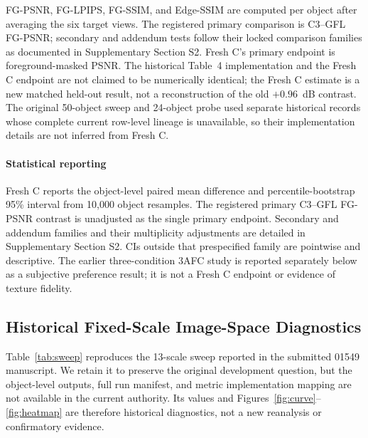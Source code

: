 \documentclass[times,twocolumn,final]{elsarticle}
\begin{document}
FG-PSNR, FG-LPIPS, FG-SSIM, and Edge-SSIM are computed per object after averaging the six target views. The registered primary comparison is C3--GFL FG-PSNR; secondary and addendum tests follow their locked comparison families as documented in Supplementary Section S2. Fresh C's primary endpoint is foreground-masked PSNR. The historical Table~4 implementation and the Fresh C endpoint are not claimed to be numerically identical; the Fresh C estimate is a new matched held-out result, not a reconstruction of the old $+0.96$~dB contrast. The original 50-object sweep and 24-object probe used separate historical records whose complete current row-level lineage is unavailable, so their implementation details are not inferred from Fresh C.

\paragraph{Statistical reporting}
Fresh C reports the object-level paired mean difference and percentile-bootstrap 95\% interval from 10{,}000 object resamples. The registered primary C3--GFL FG-PSNR contrast is unadjusted as the single primary endpoint. Secondary and addendum families and their multiplicity adjustments are detailed in Supplementary Section S2. CIs outside that prespecified family are pointwise and descriptive. The earlier three-condition 3AFC study is reported separately below as a subjective preference result; it is not a Fresh C endpoint or evidence of texture fidelity.

\subsection{Historical Fixed-Scale Image-Space Diagnostics}
\label{subsec:tradeoff}

Table~\ref{tab:sweep} reproduces the 13-scale sweep reported in the submitted 01549 manuscript. We retain it to preserve the original development question, but the object-level outputs, full run manifest, and metric implementation mapping are not available in the current authority. Its values and Figures~\ref{fig:curve}--\ref{fig:heatmap} are therefore historical diagnostics, not a new reanalysis or confirmatory evidence.
\end{document}
